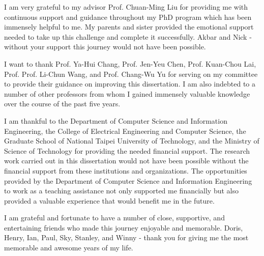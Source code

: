 I am very grateful to my advisor Prof. Chuan-Ming Liu for providing me with continuous support and guidance throughout my PhD program which has been immensely helpful to me. My parents and sister provided the emotional support needed to take up this challenge and complete it successfully. Akbar and Nick - without your support this journey would not have been possible.

I want to thank Prof. Ya-Hui Chang, Prof. Jen-Yeu Chen, Prof. Kuan-Chou Lai, Prof. Prof. Li-Chun Wang, and Prof. Chang-Wu Yu for serving on my committee to provide their guidance on improving this dissertation. I am also indebted to a number of other professors from whom I gained immensely valuable knowledge over the course of the past five years.

I am thankful to the Department of Computer Science and Information Engineering, the College of Electrical Engineering and Computer Science, the Graduate School of National Taipei University of Technology, and the Ministry of Science of Technology for providing the needed financial support. The research work carried out in this dissertation would not have been possible without the financial support from these institutions and organizations. The opportunities provided by the  Department of Computer Science and Information Engineering to work as a teaching assistance not only supported me financially but also provided a valuable experience that would benefit me in the future.

I am grateful and fortunate to have a number of close, supportive, and entertaining friends who made this journey enjoyable and memorable. Doris, Henry, Ian, Paul, Sky, Stanley, and Winny - thank you for giving me the most memorable and awesome years of my life.